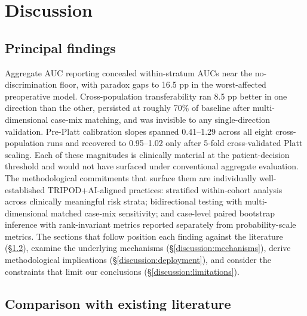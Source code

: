 

\section{Discussion}
\label{sec:discussion}

\subsection{Principal findings}
\label{discussion:findings}

Aggregate AUC reporting concealed within-stratum AUCs near the no-discrimination floor, with paradox gaps to 16.5 pp in the worst-affected preoperative model. Cross-population transferability ran 8.5 pp better in one direction than the other, persisted at roughly 70\% of baseline after multi-dimensional case-mix matching, and was invisible to any single-direction validation. Pre-Platt calibration slopes spanned 0.41--1.29 across all eight cross-population runs and recovered to 0.95--1.02 only after 5-fold cross-validated Platt scaling. Each of these magnitudes is clinically material at the patient-decision threshold and would not have surfaced under conventional aggregate evaluation. The methodological commitments that surface them are individually well-established TRIPOD+AI-aligned practices: stratified within-cohort analysis across clinically meaningful risk strata; bidirectional testing with multi-dimensional matched case-mix sensitivity; and case-level paired bootstrap inference with rank-invariant metrics reported separately from probability-scale metrics. The sections that follow position each finding against the literature (\S\ref{discussion:literature}), examine the underlying mechanisms (\S\ref{discussion:mechanisms}), derive methodological implications (\S\ref{discussion:deployment}), and consider the constraints that limit our conclusions (\S\ref{discussion:limitations}).

\subsection{Comparison with existing literature}
\label{discussion:literature}

